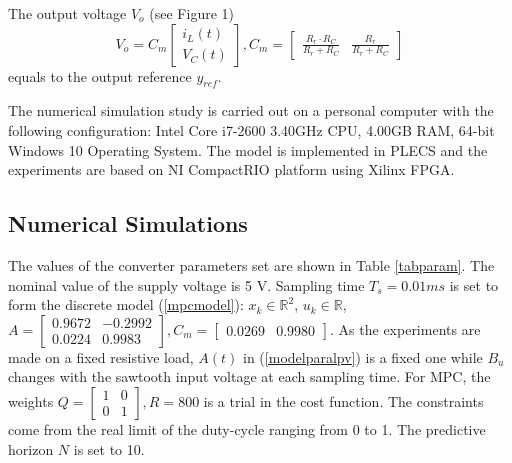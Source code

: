 \documentclass[journal]{IEEEtran}
\begin{document}
The output voltage $V_o$ (see Figure 1)
\begin{equation}\label{solvec}
{V_o} = C_m  \left[ {\begin{array}{*{20}{c}}
	{{i_L}\left( t \right)}\\
	{{V_C}\left( t \right)}
	\end{array}} \right],C_m = \left[ {\begin{array}{*{20}{c}}
	{\frac{{R_r \cdot {R_C}}}{{R_r + {R_C}}}}&{\frac{R_r}{{R_r + {R_C}}}}
	\end{array}} \right]
\end{equation}
equals to the output reference $y_{ref}$.

The numerical simulation study is carried out on a personal computer with the following configuration: Intel Core i7-2600 3.40GHz CPU, 4.00GB RAM, 64-bit Windows 10 Operating System. The model is implemented in PLECS and the experiments are based on NI CompactRIO platform using Xilinx FPGA.



\subsection{Numerical Simulations}\label{subsec}

The values of the converter parameters set are shown in Table \ref{tabparam}. The nominal value of the supply voltage is 5 V. Sampling time ${T_s} = 0.01ms$ is set to form the discrete model (\ref{mpcmodel}): $x_k \in \mathbb{R}^2$, $u_k\in \mathbb{R}$, $A = \left[ {\begin{array}{*{20}{c}}
	{0.9672}&{ - 0.2992}\\
	{0.0224}&{0.9983}
	\end{array}} \right], C_m = \left[ {\begin{array}{*{20}{c}}
	{0.0269}&{0.9980}
	\end{array}} \right]$. As the experiments are made on a fixed resistive load, $A(t)$ in (\ref{modelparalpv}) is a fixed one while ${B_u}$ changes with the sawtooth input voltage at each sampling time. For MPC, the weights $Q = \left[ {\begin{array}{*{20}{c}}
	1&0\\
	0&1
	\end{array}} \right], R=800$ is a trial in the cost function. The constraints come from the real limit of the duty-cycle ranging from 0 to 1. The predictive horizon $N$ is set to 10.
\end{document}
